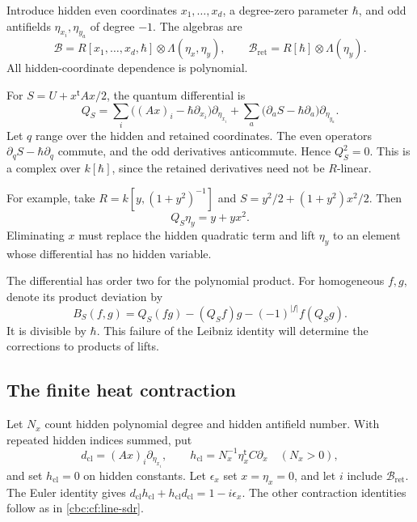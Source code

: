 Introduce hidden even coordinates $x_1,\ldots,x_d$,
a degree-zero parameter $\hbar$, and odd antifields
$\eta_{x_i},\eta_{y_a}$ of degree $-1$. The algebras are
\[
 \mathcal B=R[x_1,\ldots,x_d,\hbar]\otimes\Lambda(\eta_x,\eta_y),
 \qquad
 \mathcal B_{\mathrm{ret}}=R[\hbar]\otimes\Lambda(\eta_y).
\]
All hidden-coordinate dependence is polynomial.

For $S=U+x^{\mathsf t}Ax/2$, the quantum differential is
\begin{equation}\label{cbc:cf:Q}
 Q_S=\sum_i\bigl((Ax)_i-\hbar\partial_{x_i}\bigr)
                                      \partial_{\eta_{x_i}}
       +\sum_a\bigl(\partial_aS-\hbar\partial_a\bigr)
                                      \partial_{\eta_{y_a}}.
\end{equation}
Let $q$ range over the hidden and retained coordinates.
The even operators $\partial_qS-\hbar\partial_q$ commute,
and the odd derivatives anticommute. Hence $Q_S^2=0$.
This is a complex over $k[\hbar]$, since the retained
derivatives need not be $R$-linear.

For example, take $R=k[y,(1+y^2)^{-1}]$ and
$S=y^2/2+(1+y^2)x^2/2$. Then
\[
 Q_S\eta_y=y+yx^2.
\]
Eliminating $x$ must replace the hidden quadratic term and lift
$\eta_y$ to an element whose differential has no hidden variable.

The differential has order two for the polynomial product.
For homogeneous $f,g$, denote its product deviation by
\begin{equation}\label{cbc:cf:deviation}
 B_S(f,g)=Q_S(fg)-(Q_Sf)g-(-1)^{|f|}f(Q_Sg).
\end{equation}
It is divisible by $\hbar$. This failure of the Leibniz
identity will determine the corrections to products of lifts.

\subsection{The finite heat contraction}

Let $N_x$ count hidden polynomial degree and hidden antifield
number. With repeated hidden indices summed, put
\[
 d_{\mathrm{cl}}=(Ax)_i\partial_{\eta_{x_i}},\qquad
 h_{\mathrm{cl}}=N_x^{-1}\eta_x^{\mathsf t}C\partial_x
                   \quad(N_x>0),
\]
and set $h_{\mathrm{cl}}=0$ on hidden constants.
Let $\epsilon_x$ set $x=\eta_x=0$, and let $i$ include
$\mathcal B_{\mathrm{ret}}$. The Euler identity gives
$d_{\mathrm{cl}}h_{\mathrm{cl}}+
h_{\mathrm{cl}}d_{\mathrm{cl}}=1-i\epsilon_x$.
The other contraction identities follow as in
\eqref{cbc:cf:line-sdr}.

